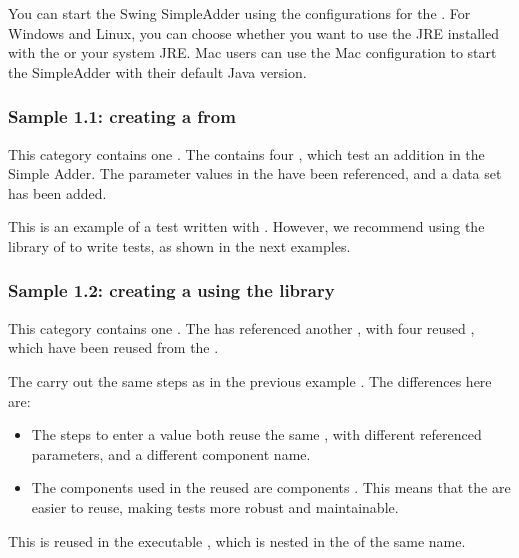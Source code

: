You can start the Swing SimpleAdder using the configurations for the  \gdaut{}. For Windows and Linux, you can choose whether you want to use the JRE installed with the \ite{} or your system JRE. Mac users can use the Mac configuration to start the SimpleAdder with their default Java version.

\subsubsection{Sample 1.1: creating a \gdcase{} from \gdsteps{}}
\label{samplesteststeps}

This category contains one \gdcase{}. The \gdcase{} contains four \gdsteps{}, which test an addition in the Simple Adder. The parameter values in the \gdsteps{} have been referenced, and a data set has been added. 

This is an example of a test written with \gdsteps{}. However, we recommend using the library of \gdcases{} to write tests, as shown in the next examples. 


\subsubsection{Sample 1.2: creating a \gdcase{} using the library}
\label{sampleslibrary}

This category contains one \gdcase{}. The \gdcase{} has referenced another \gdcase{}, with four reused \gdcases, which have been reused from the \gdproject{} . 

The \gdcases{} carry out the same steps as in the previous example . The differences here are:\\

\begin{itemize}
\item The steps to enter a value both reuse the same \gdcase{}, with different referenced parameters, and a different component name. 
\item The components used in the reused \gdcases{} are  components . This means that the \gdcases{} are easier to reuse, making tests more robust and maintainable. 
\end{itemize}

This \gdcase{} is reused in the executable \gdcase{} , which is nested in the \gdsuite{} of the same name. 

